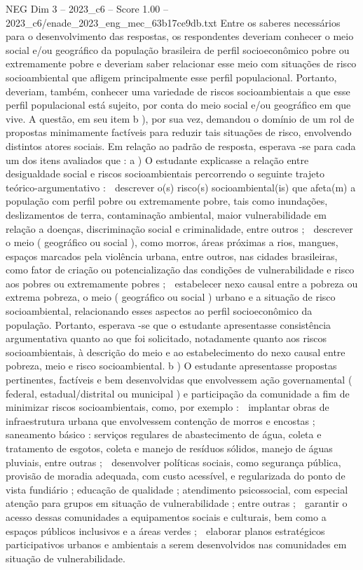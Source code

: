 \begin{textsample}{NEG Dim 3 – 2023\_c6 – Score 1.00 – 2023\_c6/enade\_2023\_eng\_mec\_63b17ce9db.txt}
Entre os saberes necessários para o desenvolvimento das respostas, os respondentes deveriam conhecer o meio social e/ou geográfico da população brasileira de perfil socioeconômico pobre ou extremamente pobre e deveriam saber relacionar esse meio com situações de risco socioambiental que afligem principalmente esse perfil populacional.
Portanto, deveriam, também, conhecer uma variedade de riscos socioambientais a que esse perfil populacional está sujeito, por conta do meio social e/ou geográfico em que vive.
A questão, em seu item b ), por sua vez, demandou o domínio de um rol de propostas minimamente factíveis para reduzir tais situações de risco, envolvendo distintos atores sociais.
Em relação ao padrão de resposta, esperava -se para cada um dos itens avaliados que : a ) O estudante explicasse a relação entre desigualdade social e riscos socioambientais percorrendo o seguinte trajeto teórico-argumentativo :  descrever o(s) risco(s) socioambiental(is) que afeta(m) a população com perfil pobre ou extremamente pobre, tais como inundações, deslizamentos de terra, contaminação ambiental, maior vulnerabilidade em relação a doenças, discriminação social e criminalidade, entre outros ;  descrever o meio ( geográfico ou social ), como morros, áreas próximas a rios, mangues, espaços marcados pela violência urbana, entre outros, nas cidades brasileiras, como fator de criação ou potencialização das condições de vulnerabilidade e risco aos pobres ou extremamente pobres ;  estabelecer nexo causal entre a pobreza ou extrema pobreza, o meio ( geográfico ou social ) urbano e a situação de risco socioambiental, relacionando esses aspectos ao perfil socioeconômico da população.
Portanto, esperava -se que o estudante apresentasse consistência argumentativa quanto ao que foi solicitado, notadamente quanto aos riscos socioambientais, à descrição do meio e ao estabelecimento do nexo causal entre pobreza, meio e risco socioambiental. b ) O estudante apresentasse propostas pertinentes, factíveis e bem desenvolvidas que envolvessem ação governamental ( federal, estadual/distrital ou municipal ) e participação da comunidade a fim de minimizar riscos socioambientais, como, por exemplo :  implantar obras de infraestrutura urbana que envolvessem contenção de morros e encostas ; saneamento básico : serviços regulares de abastecimento de água, coleta e tratamento de esgotos, coleta e manejo de resíduos sólidos, manejo de águas pluviais, entre outras ;  desenvolver políticas sociais, como segurança pública, provisão de moradia adequada, com custo acessível, e regularizada do ponto de vista fundiário ; educação de qualidade ; atendimento psicossocial, com especial atenção para grupos em situação de vulnerabilidade ; entre outras ;  garantir o acesso dessas comunidades a equipamentos sociais e culturais, bem como a espaços públicos inclusivos e a áreas verdes ;  elaborar planos estratégicos participativos urbanos e ambientais a serem desenvolvidos nas comunidades em situação de vulnerabilidade.

\end{textsample}
